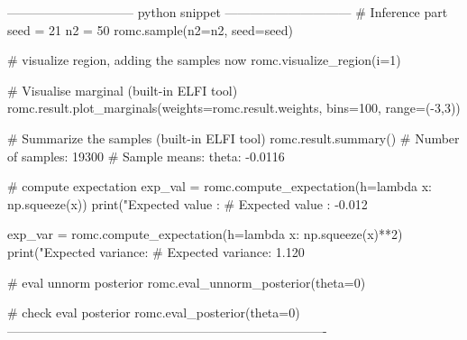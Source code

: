 \begin{Code}
------------------------------ python snippet ------------------------------  
  # Inference part
  seed = 21
  n2 = 50
  romc.sample(n2=n2, seed=seed)

  # visualize region, adding the samples now
  romc.visualize_region(i=1)

  # Visualise marginal (built-in ELFI tool)
  romc.result.plot_marginals(weights=romc.result.weights,
                             bins=100, range=(-3,3))

  # Summarize the samples (built-in ELFI tool)
  romc.result.summary()
  # Number of samples: 19300
  # Sample means: theta: -0.0116

  # compute expectation
  exp_val = romc.compute_expectation(h=lambda x: np.squeeze(x))
  print("Expected value   : %
  # Expected value   : -0.012

  exp_var = romc.compute_expectation(h=lambda x: np.squeeze(x)**2)
  print("Expected variance: %
  # Expected variance: 1.120

  # eval unnorm posterior
  romc.eval_unnorm_posterior(theta=0)

  # check eval posterior
  romc.eval_posterior(theta=0)
----------------------------------------------------------------------------
\end{Code}


